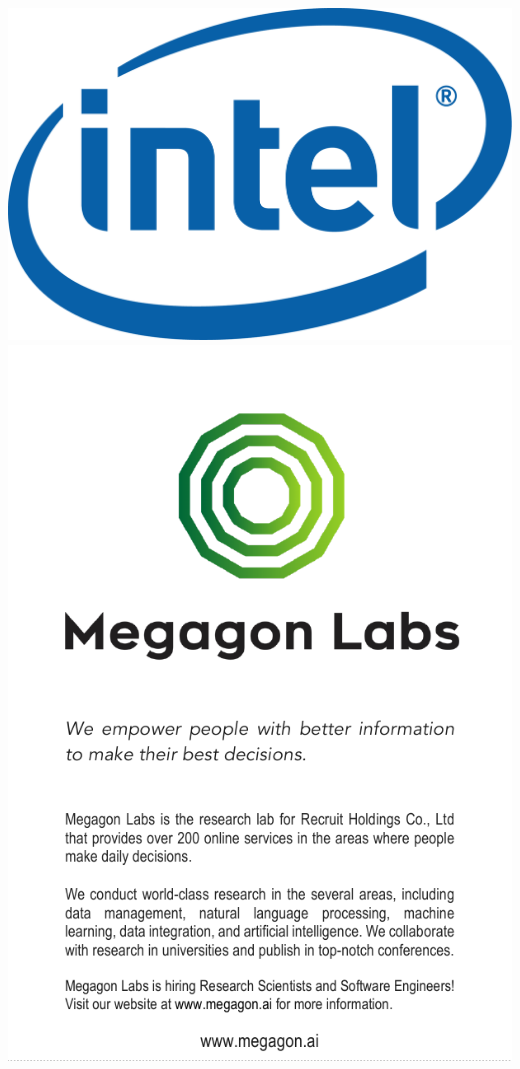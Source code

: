 \includegraphics[height=.33\textheight,width=\textwidth,keepaspectratio]{sponsoricons/intel.png}
\vfill
\includegraphics[keepaspectratio,width=\textheight,height=\textwidth]{ads/megagon-cropped.pdf}

\pagebreak

